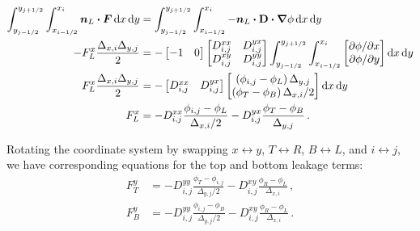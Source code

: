 \begin{align*}
\int_{y_{j-1/2}}^{y_{j+1/2}} \int_{x_{i-1/2}}^{x_{i}}
\vec{n}_L \vd \vec{F}
\ud x \ud y
&=
\int_{y_{j-1/2}}^{y_{j+1/2}} \int_{x_{i-1/2}}^{x_{i}}
-\vec{n}_L \vd \Dtens \vd \grad \phi
\ud x \ud y
\\
-F_L^x \frac{\Delta_{x,i} \Delta_{y,j}}{2}
&=
-
\begin{bmatrix}
  -1 & 0
\end{bmatrix}
\begin{bmatrix}
  D_{i,j}^{xx} & D_{i,j}^{yx} \\
  D_{i,j}^{xy} & D_{i,j}^{yy}
\end{bmatrix}
\int_{y_{j-1/2}}^{y_{j+1/2}} \int_{x_{i-1/2}}^{x_{i}}
\begin{bmatrix}
  \tpder{\phi}{x} \\
  \tpder{\phi}{y}
\end{bmatrix}
\ud x \ud y
\\
F_L^x \frac{\Delta_{x,i} \Delta_{y,j}}{2}
&=
-
\begin{bmatrix}
  D_{i,j}^{xx} & D_{i,j}^{yx}
\end{bmatrix}
\begin{bmatrix}
  \left( \phi_{i,j} - \phi_L \right) \Delta_{y,j} \\
  \left( \phi_T - \phi_B \right) \Delta_{x,i} / 2
\end{bmatrix}
\ud x \ud y
\\
F_L^x
&= 
- D_{i,j}^{xx} \frac{\phi_{i,j} - \phi_L}{ \Delta_{x,i} / 2}
- D_{i,j}^{yx} \frac{\phi_T - \phi_B}{ \Delta_{y,j} }\,.
\end{align*}

Rotating the coordinate system by swapping $x\leftrightarrow y$, $T
\leftrightarrow R$, $B \leftrightarrow L$, and $i \leftrightarrow j$, we have
corresponding equations for the top and bottom leakage terms:
\begin{align*}
F_T^y
&= 
- D_{i,j}^{yy} \frac{\phi_T - \phi_{i,j}}{ \Delta_{y,j} / 2}
- D_{i,j}^{xy} \frac{\phi_R - \phi_L}{ \Delta_{x,i} }\,,
\\  
F_B^y
&= 
- D_{i,j}^{yy} \frac{\phi_{i,j} - \phi_B}{ \Delta_{y,j} / 2}
- D_{i,j}^{xy} \frac{\phi_R - \phi_L}{ \Delta_{x,i} }\,.
\end{align*}

